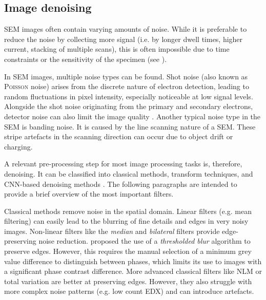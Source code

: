 
\FloatBarrier
\subsection{Image denoising}
\label{sec:denoising}


\ac{SEM} images often contain varying amounts of noise.
While it is preferable to reduce the noise by collecting more signal (i.e. by longer dwell times, higher current, stacking of multiple scans), this is often impossible due to time constraints or the sensitivity of the specimen (see ).

In \ac{SEM} images, multiple noise types can be found.
Shot noise (also known as \textsc{Poisson} noise) arises from the discrete nature of electron detection, leading to random fluctuations in pixel intensity, especially noticeable at low signal levels.
Alongside the shot noise originating from the primary and secondary electrons, detector noise can also limit the image quality \cite{agarwal.2024}.
Another typical noise type in the \ac{SEM} is banding noise.
It is caused by the line scanning nature of a \ac{SEM}.
These stripe artefacts in the scanning direction can occur due to object drift or charging.

A relevant pre-processing step for most image processing tasks is, therefore, denoising.
It can be classified into classical methods, transform techniques, and \ac{CNN}-based denoising methods \cite{fan.2019}.
The following paragraphs are intended to provide a brief overview of the most important filters.

Classical methods remove noise in the spatial domain.
Linear filters (e.g. mean filtering) can easily lead to the blurring of fine details and edges in very noisy images.
Non-linear filters like the \textit{median} \cite{huang.1979} and \textit{bilateral} \cite{tomasi.1998} filters provide edge-preserving noise reduction.
\textcite{stutzman.2015} proposed the use of a \textit{thresholded blur} algorithm \cite{schmid.2007} to preserve edges.
However, this requires the manual selection of a minimum grey value difference to distinguish between phases, which limits its use to images with a significant phase contrast difference.
More advanced classical filters like \ac{NLM} \cite{buades.2005} or total variation \cite{rudin.1992} are better at preserving edges.
However, they also struggle with more complex noise patterns (e.g. low count \ac{EDX}) and can introduce artefacts.

